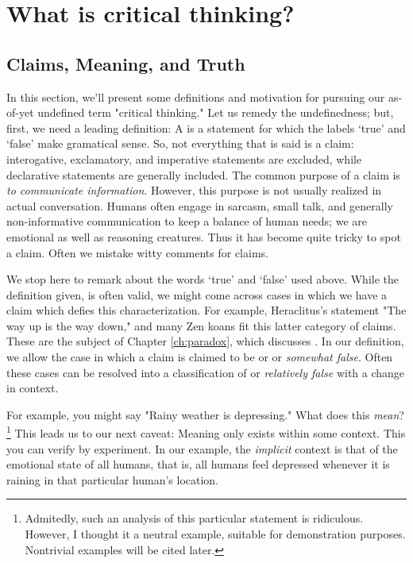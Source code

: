 \section{What is critical thinking?}

\subsection{Claims, Meaning, and Truth}

In this section, we'll present some definitions and motivation for pursuing our as-of-yet undefined term "critical thinking." Let us remedy the undefinedness; but, first, we need a leading definition: A  is a statement for which the labels `true' and `false' make gramatical sense. So, not everything that is said is a claim: interogative, exclamatory, and imperative statements are excluded, while declarative statements are generally included. The common purpose of a claim is \emph{to communicate information}. However, this purpose is not usually realized in actual conversation. Humans often engage in sarcasm, small talk, and generally non-informative communication to keep a balance of human needs; we are emotional as well as reasoning creatures. Thus it has become quite tricky to spot a claim. Often we mistake witty comments for claims.

We stop here to remark about the words `true' and `false' used above. While the definition given, is often valid, we might come across cases in which we have a claim which defies this characterization. For example, Heraclitus's statement "The way up is the way down," and many Zen koans fit this latter category of claims. These are the subject of Chapter \ref{ch:paradox}, which discusses . In our definition, we allow the case in which a claim is claimed to be  or  or \emph{somewhat false}. Often these cases can be resolved into a classification of  or \emph{relatively false} with a change in context.

For example, you might say "Rainy weather is depressing." What does this \emph{mean}?\footnote{Admitedly, such an analysis of this particular statement is ridiculous. However, I thought it a neutral example, suitable for demonstration purposes. Nontrivial examples will be cited later.} This leads us to our next caveat: Meaning only exists within some context. This you can verify by experiment. In our example, the \emph{implicit} context is that of the emotional state of all humans, that is, all humans feel depressed whenever it is raining in that particular human's location.

